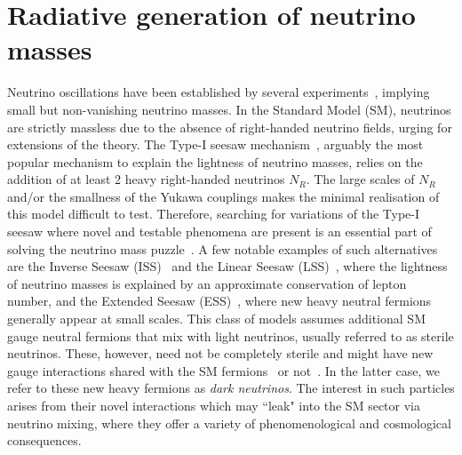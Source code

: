 \section{Radiative generation of neutrino masses}
Neutrino oscillations have been established by several experiments~\cite{Fukuda:1998ah,*Ahmad:2002jz,*Eguchi:2002dm}, implying small but non-vanishing neutrino masses. In the Standard Model (SM), neutrinos are strictly massless due to the absence of right-handed neutrino fields, urging for extensions of the theory. The Type-I seesaw mechanism~\cite{Minkowski:1977sc,*Mohapatra:1979ia,*GellMann:1980vs,*Yanagida:1979as,*Lazarides:1980nt,*Mohapatra:1980yp,*Schechter:1980gr,*Cheng:1980qt,*Foot:1988aq}, arguably the most popular mechanism to explain the lightness of neutrino masses, relies on the addition of at least 2 heavy right-handed neutrinos $N_R$. The large scales of $N_R$ and/or the smallness of the Yukawa couplings makes the minimal realisation of this model difficult to test. Therefore, searching for variations of the Type-I seesaw where novel and testable phenomena are present is an essential part of solving the neutrino mass puzzle~\cite{Boucenna:2014zba}. A few notable examples of such alternatives are the Inverse Seesaw (ISS)~\cite{Mohapatra:1986bd,*GonzalezGarcia:1988rw} and the Linear Seesaw (LSS)~\cite{Wyler:1982dd,*Akhmedov:1995ip,*Akhmedov:1995vm}, where the lightness of neutrino masses is explained by an approximate conservation of lepton number, and the Extended Seesaw (ESS)~\cite{Barry:2011wb,*Zhang:2011vh}, where new heavy neutral fermions generally appear at small scales.
This class of models assumes additional SM gauge neutral fermions that mix with light neutrinos, usually referred to as sterile neutrinos. These, however, need not be completely sterile and might have new gauge interactions shared with the SM fermions~\cite{%
Buchmuller:1991ce,%
Khalil:2006yi,%
Perez:2009mu,%
Khalil:2010iu,%
Dib:2014fua,%
Baek:2015mna,%
DeRomeri:2017oxa,%
Nomura:2018mwr,%
Brdar:2018sbk%
} or not~\cite{%
Okada:2014nsa,%
Diaz:2017edh,%
Bertuzzo:2017sbj,%
Nomura:2018ibs,%
Bertuzzo:2018ftf%
}. In the latter case, we refer to these new heavy fermions as \textit{dark neutrinos}. The interest in such particles arises from their novel interactions which may ``leak" into the SM sector via neutrino mixing, where they offer a variety of phenomenological and cosmological consequences. 

